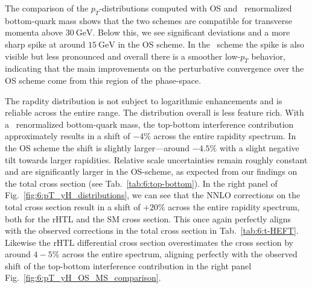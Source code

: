 The comparison of the $p_T$-distributions computed with \acs{OS} and \MS\ renormalized bottom-quark mass shows that the two schemes are compatible for transverse momenta above $30\ \mathrm{GeV}$. Below this, we see significant deviations and a more sharp spike at around $15\ \mathrm{GeV}$ in the \acs{OS} scheme. In the \MS\ scheme the spike is also visible but less pronounced and overall there is a smoother low-$p_T$ behavior, indicating that the main improvements on the perturbative convergence over the \acs{OS} scheme come from this region of the phase-space.

The rapdity distribution is not subject to logarithmic enhancements and is reliable across the entire range. The distribution overall is less feature rich. With a \MS\ renormalized bottom-quark mass, the top-bottom interference contribution approximately results in a shift of $-4\%$ across the entire rapidity spectrum. In the \acs{OS} scheme the shift is slightly larger---around $-4.5\%$ with a slight negative tilt towards larger rapidities. Relative scale uncertainties remain roughly constant and are significantly larger in the \acs{OS}-scheme, as expected from our findings on the total cross section (see Tab.~\ref{tab:6:top-bottom}). In the right panel of Fig.~\ref{fig:6:pT_yH_distributions}, we can see that the \acs{NNLO} corrections on the total cross section result in a shift of $+20\%$ across the entire rapidity spectrum, both for the \acs{rHTL} and the \acs{SM} cross section. This once again perfectly aligns with the observed corrections in the total cross section in Tab.~\ref{tab:6:t-HEFT}. Likewise the \acs{rHTL} differential cross section overestimates the cross section by around $4-5\%$ across the entire spectrum, aligning perfectly with the observed shift of the top-bottom interference contribution in the right panel Fig.~\ref{fig:6:pT_yH_OS_MS_comparison}.

